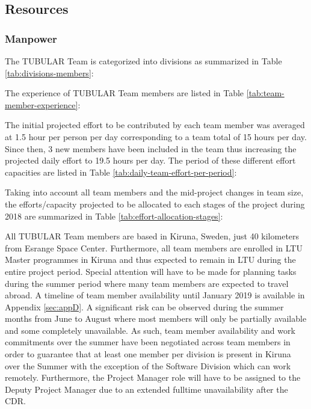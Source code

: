 \subsection{Resources}

\subsubsection{Manpower}
The TUBULAR Team is categorized into divisions as summarized in Table \ref{tab:divisions-members}:



The experience of TUBULAR Team members are listed in Table \ref{tab:team-member-experience}:



The initial projected effort to be contributed by each team member was averaged at 1.5 hour per person per day corresponding to a team total of 15 hours per day. Since then, 3 new members have been included in the team thus increasing the projected daily effort to 19.5 hours per day. The period of these different effort capacities are listed in Table \ref{tab:daily-team-effort-per-period}:



Taking into account all team members and the mid-project changes in team size, the efforts/capacity projected to be allocated to each stages of the project during 2018 are summarized in Table \ref{tab:effort-allocation-stages}:



All TUBULAR Team members are based in Kiruna, Sweden, just 40 kilometers from Esrange Space Center. Furthermore, all team members are enrolled in LTU Master programmes in Kiruna and thus expected to remain in LTU during the entire project period. Special attention will have to be made for planning tasks during the summer period where many team members are expected to travel abroad. A timeline of team member availability  until January 2019 is available in Appendix \ref{sec:appD}. A significant risk can be observed during the summer months from June to August where most members will only be partially available and some completely unavailable. As such, team member availability and work commitments over the summer have been negotiated across team members in order to guarantee that at least one member per division is present in Kiruna over the Summer with the exception of the Software Division which can work remotely. Furthermore, the Project Manager role will have to be assigned to the Deputy Project Manager due to an extended fulltime unavailability after the CDR.

